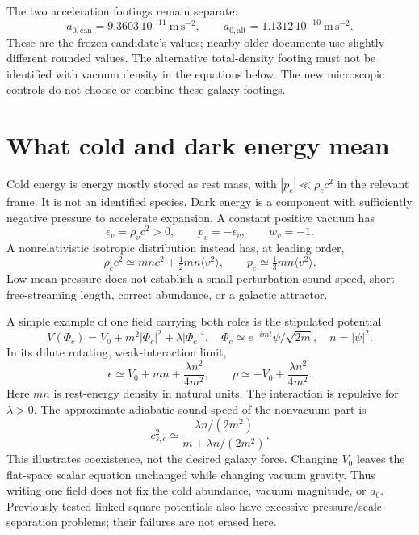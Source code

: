 \documentclass[11pt]{article}
\begin{document}
The two acceleration footings remain separate:
\begin{equation}
 a_{0,\mathrm{can}}=9.3603\,10^{-11}\ \mathrm{m\,s^{-2}},\qquad
 a_{0,\mathrm{alt}}=1.1312\,10^{-10}\ \mathrm{m\,s^{-2}}.
\end{equation}
These are the frozen candidate's values; nearby older documents use slightly
different rounded values. The alternative total-density footing must not
be identified with vacuum density in the equations below. The new microscopic
controls do not choose or combine these galaxy footings.

\section{What cold and dark energy mean}
Cold energy is energy mostly stored as rest mass, with
$|p_c|\ll\rho_c c^2$ in the relevant frame. It is not an identified species.
Dark energy is a component with sufficiently negative pressure to accelerate
expansion. A constant positive vacuum has
\begin{equation}
 \epsilon_v=\rho_v c^2>0,\qquad p_v=-\epsilon_v,\qquad w_v=-1.
\end{equation}
A nonrelativistic isotropic distribution instead has, at leading order,
\begin{equation}
 \rho_c c^2\simeq mn c^2+\tfrac12 mn\langle v^2\rangle,
 \qquad p_c\simeq\tfrac13 mn\langle v^2\rangle.
\end{equation}
Low mean pressure does not establish a small perturbation sound speed,
short free-streaming length, correct abundance, or a galactic attractor.

A simple example of one field carrying both roles is the stipulated potential
\begin{equation}
 V(\Phi_c)=V_0+m^2|\Phi_c|^2+\lambda|\Phi_c|^4,\quad
 \Phi_c\simeq e^{-imt}\psi/\sqrt{2m},\quad n=|\psi|^2.
\end{equation}
In its dilute rotating, weak-interaction limit,
\begin{equation}
 \epsilon\simeq V_0+mn+\frac{\lambda n^2}{4m^2},\qquad
 p\simeq-V_0+\frac{\lambda n^2}{4m^2}.
\end{equation}
Here $mn$ is rest-energy density in natural units. The interaction is
repulsive for $\lambda>0$. The approximate adiabatic sound speed of the
nonvacuum part is
\begin{equation}
 c_{s,c}^2\simeq
 \frac{\lambda n/(2m^2)}{m+\lambda n/(2m^2)}.
\end{equation}
This illustrates coexistence, not the desired galaxy force. Changing $V_0$
leaves the flat-space scalar equation unchanged while changing vacuum gravity.
Thus writing one field does not fix the cold abundance, vacuum magnitude,
or $a_0$. Previously tested linked-square potentials also have excessive
pressure/scale-separation problems; their failures are not erased here.
\end{document}
